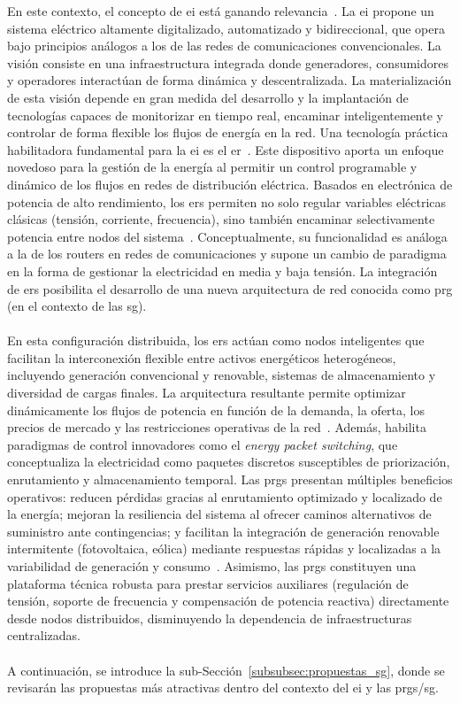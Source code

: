 En este contexto, el concepto de \gls{ei} está ganando relevancia~\cite{Xu11}. La \gls{ei} propone un sistema eléctrico altamente digitalizado, automatizado y bidireccional, que opera bajo principios análogos a los de las redes de comunicaciones convencionales. La visión consiste en una infraestructura integrada donde generadores, consumidores y operadores interactúan de forma dinámica y descentralizada. La materialización de esta visión depende en gran medida del desarrollo y la implantación de tecnologías capaces de monitorizar en tiempo real, encaminar inteligentemente y controlar de forma flexible los flujos de energía en la red. Una tecnología práctica habilitadora fundamental para la \gls{ei} es el \gls{er}~\cite{Zhou24}. Este dispositivo aporta un enfoque novedoso para la gestión de la energía al permitir un control programable y dinámico de los flujos en redes de distribución eléctrica. Basados en electrónica de potencia de alto rendimiento, los \glspl{er} permiten no solo regular variables eléctricas clásicas (tensión, corriente, frecuencia), sino también encaminar selectivamente potencia entre nodos del sistema~\cite{Zhu25}. Conceptualmente, su funcionalidad es análoga a la de los routers en redes de comunicaciones y supone un cambio de paradigma en la forma de gestionar la electricidad en media y baja tensión. La integración de \glspl{er} posibilita el desarrollo de una nueva arquitectura de red conocida como \gls{prg} (en el contexto de las \gls{sg}).\\
\\
En esta configuración distribuida, los \glspl{er} actúan como nodos inteligentes que facilitan la interconexión flexible entre activos energéticos heterogéneos, incluyendo generación convencional y renovable, sistemas de almacenamiento y diversidad de cargas finales. La arquitectura resultante permite optimizar dinámicamente los flujos de potencia en función de la demanda, la oferta, los precios de mercado y las restricciones operativas de la red~\cite{Liu18}. Además, habilita paradigmas de control innovadores como el \textit{energy packet switching}, que conceptualiza la electricidad como paquetes discretos susceptibles de priorización, enrutamiento y almacenamiento temporal. Las \glspl{prg} presentan múltiples beneficios operativos: reducen pérdidas gracias al enrutamiento optimizado y localizado de la energía; mejoran la resiliencia del sistema al ofrecer caminos alternativos de suministro ante contingencias; y facilitan la integración de generación renovable intermitente (fotovoltaica, eólica) mediante respuestas rápidas y localizadas a la variabilidad de generación y consumo~\cite{Wu2021}. Asimismo, las \glspl{prg} constituyen una plataforma técnica robusta para prestar servicios auxiliares (regulación de tensión, soporte de frecuencia y compensación de potencia reactiva) directamente desde nodos distribuidos, disminuyendo la dependencia de infraestructuras centralizadas.\\
\\
A continuación, se introduce la sub-Sección~\ref{subsubsec:propuestas_sg}, donde se revisarán las propuestas más atractivas dentro del contexto del \gls{ei} y las \glspl{prg}/\gls{sg}.

